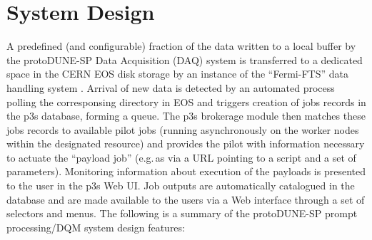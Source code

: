\documentclass{webofc}
\newcommand{\pd}{protoDUNE\xspace}
\begin{document}
\section{System Design}
\label{sec:outline}

A predefined (and configurable) fraction of the data written to a local buffer
by the  \pd-SP Data Acquisition (DAQ) system is  transferred to a dedicated space
in the  CERN EOS disk storage  \cite{castoreos} by an instance of the ``Fermi-FTS''
data handling system \cite{fts}. Arrival of new data is detected by an automated process
polling the corresponsing directory in EOS and triggers creation of jobs records in the
p3s database, forming a queue. The p3s brokerage module then matches these jobs records
to available pilot jobs (running asynchronously on the worker nodes within the designated
resource) and provides the pilot with information necessary to actuate the ``payload job'' (e.g.\,as via a URL
pointing to a script and a set of parameters). Monitoring information about execution
of the payloads is presented to the user in the p3s Web UI.
Job outputs are automatically catalogued in the database and are made available
to the users via a Web interface through a set of selectors and menus.
The following is a summary  of the \pd-SP
prompt processing/DQM system design features\cite{chep18}:
\end{document}
